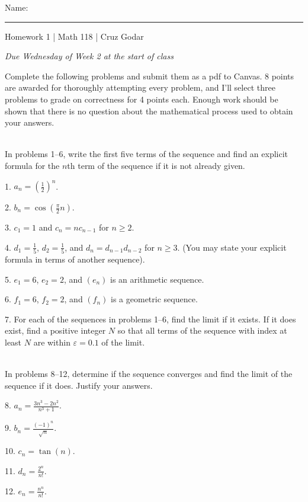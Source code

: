 \documentclass{article}
\begin{document}
\Large Name: \rule{2in}{0.15mm} \hfill Homework 1 | Math 118 | Cruz Godar \vspace{4pt} \normalsize

\textit{Due Wednesday of Week 2 at the start of class}

Complete the following problems and submit them as a pdf to Canvas. 8 points are awarded for thoroughly attempting every problem, and I'll select three problems to grade on correctness for 4 points each. Enough work should be shown that there is no question about the mathematical process used to obtain your answers. 

~\\

In problems 1--6, write the first five terms of the sequence and find an explicit formula for the $n$th term of the sequence if it is not already given.

1. $\displaystyle a_n = \left( \frac{1}{2} \right)^n$.

2. $\displaystyle b_n = \cos\left( \frac{\pi}{2} n \right)$.

3. $\displaystyle c_1 = 1$ and $\displaystyle c_n = nc_{n - 1}$ for $n \geq 2$.

4. $\displaystyle d_1 = \frac{1}{5}$, $\displaystyle d_2 = \frac{1}{5}$, and $d_n = d_{n - 1}d_{n - 2}$ for $n \geq 3$. (You may state your explicit formula in terms of another sequence).

5. $e_1 = 6$, $e_2 = 2$, and $(e_n)$ is an arithmetic sequence.

6. $f_1 = 6$, $f_2 = 2$, and $(f_n)$ is a geometric sequence.

7. For each of the sequences in problems 1--6, find the limit if it exists. If it does exist, find a positive integer $N$ so that all terms of the sequence with index at least $N$ are within $\varepsilon = 0.1$ of the limit.

~\\

In problems 8--12, determine if the sequence converges and find the limit of the sequence if it does. Justify your answers.

8. $\displaystyle a_n = \frac{3n^3 - 2n^2}{n^3 + 1}$.

9. $\displaystyle b_n = \frac{(-1)^n}{\sqrt{n}}$.

10. $\displaystyle c_n = \tan(n)$.

11. $\displaystyle d_n = \frac{2^n}{n!}$.

12. $\displaystyle e_n = \frac{n^n}{n!}$.
\end{document}
